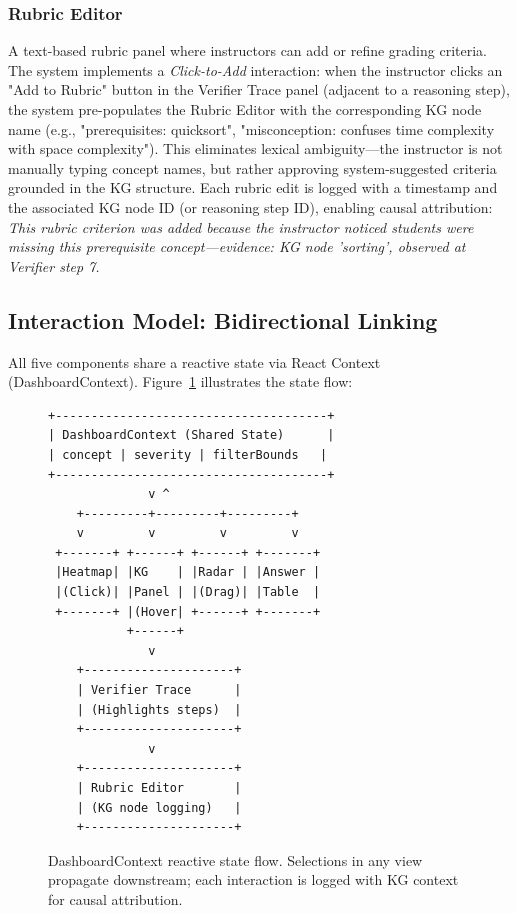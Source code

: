 \documentclass[journal,review]{vgtc}
\begin{document}
\subsubsection{Rubric Editor}
A text-based rubric panel where instructors can add or refine grading criteria. The system implements a \textit{Click-to-Add} interaction: when the instructor clicks an "Add to Rubric" button in the Verifier Trace panel (adjacent to a reasoning step), the system pre-populates the Rubric Editor with the corresponding KG node name (e.g., "prerequisites: quicksort", "misconception: confuses time complexity with space complexity"). This eliminates lexical ambiguity---the instructor is not manually typing concept names, but rather approving system-suggested criteria grounded in the KG structure. Each rubric edit is logged with a timestamp and the associated KG node ID (or reasoning step ID), enabling causal attribution: \textit{This rubric criterion was added because the instructor noticed students were missing this prerequisite concept---evidence: KG node 'sorting', observed at Verifier step 7.}

\subsection{Interaction Model: Bidirectional Linking}

All five components share a reactive state via React Context (DashboardContext). Figure~\ref{fig:dashboard_context} illustrates the state flow:

\begin{figure}[ht]
\centering
\begin{verbatim}
+--------------------------------------+
| DashboardContext (Shared State)      |
| concept | severity | filterBounds   |
+--------------------------------------+
              v ^
    +---------+---------+---------+
    v         v         v         v
 +-------+ +------+ +------+ +-------+
 |Heatmap| |KG    | |Radar | |Answer |
 |(Click)| |Panel | |(Drag)| |Table  |
 +-------+ |(Hover| +------+ +-------+
           +------+
              v
    +---------------------+
    | Verifier Trace      |
    | (Highlights steps)  |
    +---------------------+
              v
    +---------------------+
    | Rubric Editor       |
    | (KG node logging)   |
    +---------------------+
\end{verbatim}
\caption{DashboardContext reactive state flow. Selections in any view propagate downstream; each interaction is logged with KG context for causal attribution.}
\label{fig:dashboard_context}
\end{figure}
\end{document}
